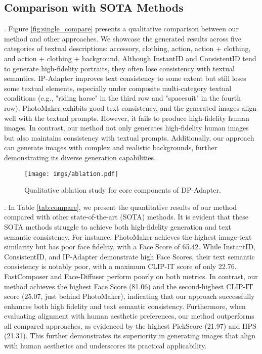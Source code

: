\subsection{Comparison with SOTA Methods}


.
Figure \ref{fig:single_compare} presents a qualitative comparison between our method and other approaches. We showcase the generated results across five categories of textual descriptions: accessory, clothing, action, action + clothing, and action + clothing + background. Although InstantID \cite{wang2024instantid} and ConsistentID \cite{huang2024consistentid} tend to generate high-fidelity portraits, they often lose consistency with textual semantics. IP-Adapter \cite{ye2023ip} improves text consistency to some extent but still loses some textual elements, especially under composite multi-category textual conditions (e.g., "riding horse" in the third row and "spacesuit" in the fourth row). PhotoMaker \cite{li2024photomaker} exhibits good text consistency, and the generated images align well with the textual prompts. However, it fails to produce high-fidelity human images. In contrast, our method not only generates high-fidelity human images but also maintains consistency with textual prompts. Additionally, our approach can generate images with complex and realistic backgrounds, further demonstrating its diverse generation capabilities.



\begin{figure}[t]
    \centering
    \texttt{[image: imgs/ablation.pdf]} %
    \caption{Qualitative ablation study for core components of DP-Adapter.} %
    \label{fig:ablation} %
\end{figure}


. 
In Table \ref{tab:compare}, we present the quantitative results of our method compared with other state-of-the-art (SOTA) methods. It is evident that these SOTA methods struggle to achieve both high-fidelity generation and text semantic consistency. For instance, PhotoMaker achieves the highest image-text similarity but has poor face fidelity, with a Face Score of 65.42. While InstantID, ConsistentID, and IP-Adapter demonstrate high Face Scores, their text semantic consistency is notably poor, with a maximum CLIP-IT score of only 22.76. FastComposer and Face-Diffuser perform poorly on both metrics. In contrast, our method achieves the highest Face Score (81.06) and the second-highest CLIP-IT score (25.07, just behind PhotoMaker), indicating that our approach successfully enhances both high fidelity and text semantic consistency. Furthermore, when evaluating alignment with human aesthetic preferences, our method outperforms all compared approaches, as evidenced by the highest PickScore (21.97) and HPS (21.31). This further demonstrates its superiority in generating images that align with human aesthetics and underscores its practical applicability.


